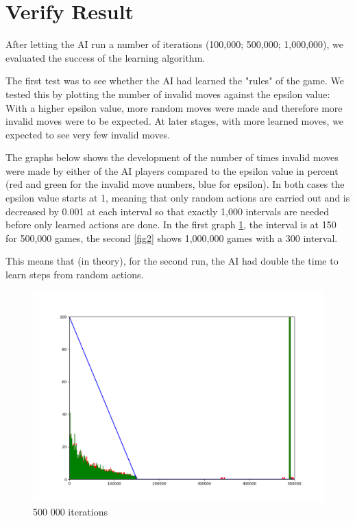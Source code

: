 \section{Verify Result}
\label{sec:verify}

After letting the \ac{AI} run a number of iterations (100,000; 500,000; 1,000,000), we evaluated the success of the learning algorithm.

The first test was to see whether the \ac{AI} had learned the "rules" of the game. We tested this by plotting the number of invalid moves against the epsilon value: With a higher epsilon value, more random moves were made and therefore more invalid moves were to be expected.
At later stages, with more learned moves, we expected to see very few invalid moves.

The graphs below shows the development of the number of times invalid moves were made by either of the \ac{AI} players compared to the epsilon value in percent (red and green for the invalid move numbers, blue for epsilon).
In both cases the epsilon value starts at 1, meaning that only random actions are carried out and is decreased by 0.001 at each interval so that exactly 1,000 intervals are needed before only learned actions are done. In the first graph \ref{fig1}, the interval is at 150 for 500,000 games, the second \ref{fig2} shows 1,000,000 games with a 300 interval.

This means that (in theory), for the second run, the \ac{AI} had double the time to learn steps from random actions.
\begin{figure}[H]
	\centering
  	\includegraphics[width=\textwidth]{../plot_500k.png}
	\caption{500 000 iterations}
	\label{fig1}
\end{figure}

